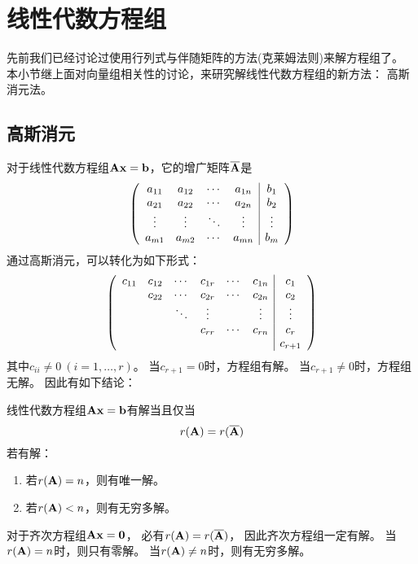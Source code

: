 \section{线性代数方程组}
先前我们已经讨论过使用行列式与伴随矩阵的方法(克莱姆法则)来解方程组了。
本小节继上面对向量组相关性的讨论，来研究解线性代数方程组的新方法：
高斯消元法。

\subsection{高斯消元}
对于线性代数方程组$\mmA\mvx=\mvb$，它的增广矩阵$\overline{\mmA}$是
\begin{displaymath}
  \mmat{cccc|c}{
    a_{11} & a_{12} & \cdots & a_{1n} & b_1 \\
    a_{21} & a_{22} & \cdots & a_{2n} & b_2 \\
    \vdots & \vdots & \ddots & \vdots & \vdots \\
    a_{m1} & a_{m2} & \cdots & a_{mn} & b_m 
  }
\end{displaymath}
通过高斯消元，可以转化为如下形式：
\begin{equation} \label{eq-gauss-elim}
  \mmat{cccccc|c}{
    c_{11} & c_{12} & \cdots & c_{1r} & \cdots & c_{1n} & c_1    \\
           & c_{22} & \cdots & c_{2r} & \cdots & c_{2n} & c_2    \\
           &        & \ddots & \vdots &        & \vdots & \vdots \\
           &        &        & c_{rr} & \cdots & c_{rn} & c_r    \\
           &        &        &        &        &        & c_{r+1}
  }
\end{equation}
其中$c_{ii}\neq 0\ (i=1,\dots,r)$。
当$c_{r+1}=0$时，方程组有解。
当$c_{r+1}\neq 0$时，方程组无解。
因此有如下结论：

\begin{theorem}[线性代数方程组有解的充要条件]
  线性代数方程组$\mmA\mvx=\mvb$有解当且仅当
  \[ r(\mmA) = r(\overline{\mmA}) \]
  若有解：
  \begin{enumerate}
    \item 若$r(\mmA)=n$，则有唯一解。
    \item 若$r(\mmA) < n$，则有无穷多解。
  \end{enumerate}
\end{theorem}

\begin{remark}
  对于齐次方程组$\mmA\mvx=\mvZero$，
  必有$r(\mmA)=r(\overline{\mmA})$，
  因此齐次方程组一定有解。
  当$r(\mmA)=n$时，则只有零解。
  当$r(\mmA)\neq n$时，则有无穷多解。
\end{remark}

